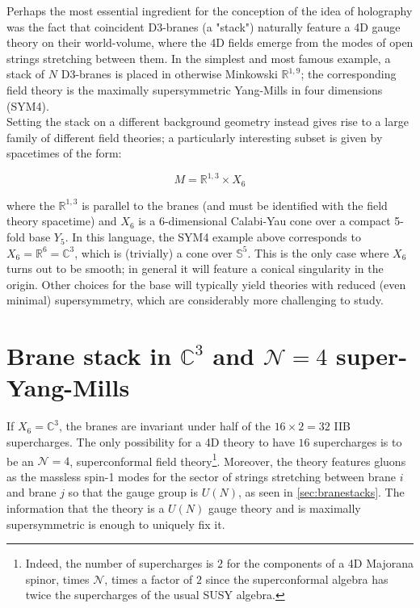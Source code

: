 

Perhaps the most essential ingredient for the conception of the idea of holography was the fact that coincident D3-branes (a "stack") naturally feature a 4D gauge theory on their world-volume, where the 4D fields emerge from the modes of open strings stretching between them. In the simplest and most famous example, a stack of $N$ D3-branes is placed in otherwise Minkowski $\mathbb{R}^{1,9}$; the corresponding field theory is the maximally supersymmetric Yang-Mills in four dimensions (SYM4).\\

Setting the stack on a different background geometry instead gives rise to a large family of different field theories; a particularly interesting subset is given by spacetimes of the form:

\begin{equation} 
	M = \mathbb{R}^{1,3} \times X_6 
\end{equation}

where the $\mathbb{R}^{1,3}$ is parallel to the branes (and must be identified with the field theory spacetime) and $X_6$ is a 6-dimensional Calabi-Yau cone over a compact 5-fold base $Y_5$. In this language, the SYM4 example above corresponds to $X_6 = \mathbb{R}^6 = \mathbb{C}^3$, which is (trivially) a cone over $\mathbb{S}^5$. This is the only case where $X_6$ turns out to be smooth; in general it will feature a conical singularity in the origin. Other choices for the base will typically yield theories with reduced (even minimal) supersymmetry, which are considerably more challenging to study.

\section{Brane stack in $\mathbb{C}^3$ and $\mathcal{N}=4$ super-Yang-Mills}

If $X_6 = \mathbb{C}^3$, the branes are invariant under half of the $16 \times 2 = 32$ IIB supercharges. The only possibility for a 4D theory to have $16$ supercharges is to be an $\mathcal{N}=4$, superconformal field theory\footnote{Indeed, the number of supercharges is $2$ for the components of a 4D Majorana spinor, times $\mathcal{N}$, times a factor of $2$ since the superconformal algebra has twice the supercharges of the usual SUSY algebra.}. Moreover, the theory features gluons as the massless spin-1 modes for the sector of strings stretching between brane $i$ and brane $j$ so that the gauge group is $U(N)$, as seen in \ref{sec:branestacks}. The information that the theory is a $U(N)$ gauge theory and is maximally supersymmetric is enough to uniquely fix it.\\

